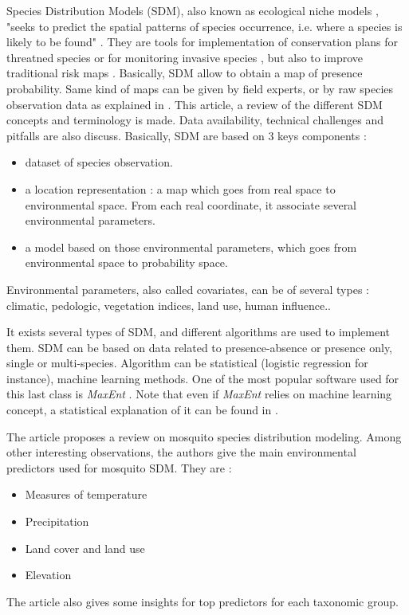 \documentclass{article}
\begin{document}
Species Distribution Models (SDM), also known as ecological niche models \cite{barker_species_2022}, "seeks to predict the spatial patterns of species occurrence, i.e. where a species is likely to be found" \cite{beery_species_2021}. They are tools for implementation of conservation plans for threatned species or for monitoring invasive species \cite{deneu_very_2022}, but also to improve traditional risk maps \cite{barker_species_2022}.
Basically, SDM allow to obtain a map of presence probability. Same kind of maps can be given by field experts, or by raw species observation data as explained in \cite{beery_species_2021}. This article, a review of the different SDM concepts and terminology is made. Data availability, technical challenges and pitfalls are also discuss. Basically, SDM are based on 3 keys components : 
\begin{itemize}
\item dataset of species observation.
\item a location representation : a map which goes from real space to environmental space. From each real coordinate, it associate several environmental parameters.
\item a model based on those environmental parameters, which goes from environmental space to probability space.
\end{itemize}
Environmental parameters, also called covariates, can be of several types \cite{beery_species_2021} : climatic, pedologic, vegetation indices, land use, human influence..

\medskip
It exists several types of SDM, and different algorithms are used to implement them. SDM can be based on data related to presence-absence or presence only, single or multi-species. Algorithm can be statistical (logistic regression for instance), machine learning methods. One of the most popular software used for this last class is \textit{MaxEnt} \cite{phillips_maximum_2006}. Note that even if \textit{MaxEnt} relies on machine learning concept, a statistical explanation of it can be found in \cite{elith_statistical_2011}.

The article \cite{lippi_trends_2023} proposes a review on mosquito species distribution modeling. Among other interesting observations, the authors give the main environmental predictors used for mosquito SDM. They are : 
\begin{itemize}
\item Measures of temperature
\item Precipitation
\item Land cover and land use
\item Elevation
\end{itemize}
The article \cite{lippi_trends_2023} also gives some insights for top predictors for each taxonomic group.
\end{document}
